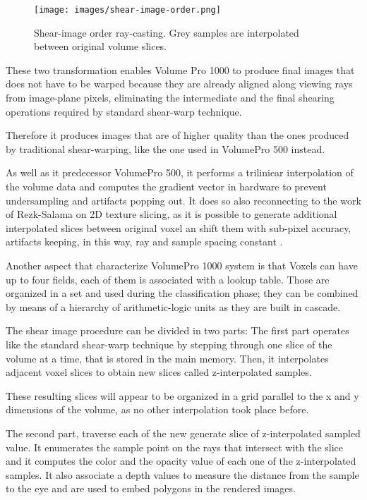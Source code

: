 \documentclass[12pt,a4paper]{extarticle}
\newcommand{\linespace}{\vspace{8pt}}
\begin{document}
\begin{figure}[hbtp]
\centering
\texttt{[image: images/shear-image-order.png]}
\caption{Shear-image order ray-casting. Grey samples are interpolated between original volume slices.}
\label{fig:shearimageorder}
\end{figure}


These two transformation enables Volume Pro 1000 to produce final images that does not have to be warped because they are already aligned along viewing rays from image-plane pixels, eliminating the intermediate and the final shearing operations required by standard shear-warp technique. 

Therefore it produces images that are of higher quality than the ones produced by traditional shear-warping, like the one used in VolumePro 500 instead. %
\linespace

As well as it predecessor VolumePro 500, it performs a triliniear interpolation of the volume data and computes the gradient vector in hardware to prevent undersampling and artifacts popping out. It does so also reconnecting to the work of Rezk-Salama on 2D texture slicing, as it is possible to generate additional interpolated slices between original voxel an shift them with sub-pixel accuracy, artifacts keeping, in this way, ray and sample spacing constant \cite{PFISTER2005229}.


Another aspect that characterize VolumePro 1000 system is that Voxels can have up to four fields, each of them is associated with a lookup table. Those are organized in a set and used during the classification phase; they can be combined by means of a hierarchy of arithmetic-logic units as they are built in cascade.
\linespace

The shear image procedure can be divided in two parts: The first part operates like the standard shear-warp technique by stepping through one slice of the volume at a time, that is stored in the main memory. Then, it interpolates adjacent voxel slices to obtain new slices called z-interpolated samples. 

These resulting slices will appear to be organized in a grid parallel to the x and y dimensions of the volume, as no other interpolation took place before.
\linespace

The second part, traverse each of the new generate slice of z-interpolated sampled value. It enumerates the sample point on the rays that intersect with the slice and it computes the color and the opacity value of each one of the z-interpolated samples. It also associate a depth values to measure the distance from the sample to the eye and are used to embed polygons in the rendered images.
\end{document}
